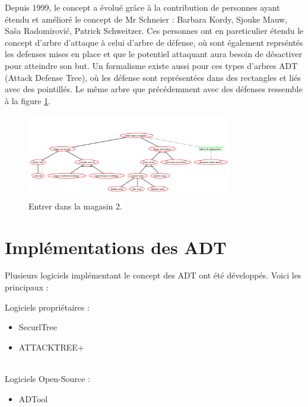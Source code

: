 		Depuis 1999, le concept a évolué grâce à la contribution de personnes ayant étendu et amélioré le concept de Mr Schneier : Barbara Kordy, Sjouke Mauw, Saša Radomirović, Patrick Schweitzer. Ces personnes ont en pareticulier étendu le concept d'arbre d'attaque à celui d'arbre de défense, où sont également reprséntés les defenses mises en place et que le potentiel attaquant aura besoin de désactiver pour atteindre son but. Un formalisme existe aussi pour ces types d'arbres ADT (Attack Defense Tree), où les défense sont représentées dans des rectangles et liés avec des pointillés. Le même arbre que précédemment avec des défenses ressemble à la figure \ref{fig:arbre_exemple_2}.

		\begin{figure}
            \begin{center}
                \includegraphics[width=0.8\textwidth]{figure/Entrer_dans_un_magasin2.png}
            \end{center}
            \caption{Entrer dans la magasin 2.}
            \label{fig:arbre_exemple_2}
		\end{figure}

	\section{Implémentations des ADT}
		Plusieurs logiciels implémentant le concept des ADT ont été développés. Voici les principaux :
        
		{\large Logiciels propriétaires :}
		\begin{itemize}
			\item SecurlTree
			\item ATTACKTREE+
		\end{itemize}
		~~\\
		{\large Logiciels Open-Source :}
		\begin{itemize}
			\item ADTool
		\end{itemize}

